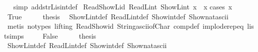 \begin{isabellebody}
%
\isadelimproof
\ \ %
\endisadelimproof
%
\isatagproof
{}\isamarkupfalse%
{\isacharparenleft}{\kern0pt}simp\ add{\isacharcolon}{\kern0pt}strL{\isacharunderscore}{\kern0pt}is{\isacharunderscore}{\kern0pt}int{\isacharprime}{\kern0pt}{\isacharunderscore}{\kern0pt}def{\isacharparenright}{\kern0pt}%
\endisatagproof
{\isafoldproof}%
%
\isadelimproof
\isanewline
%
\endisadelimproof
\isanewline
{}\isamarkupfalse%
\ Read{\isacharunderscore}{\kern0pt}ShowL{\isacharunderscore}{\kern0pt}id{\isacharcolon}{\kern0pt}\ {\isacartoucheopen}ReadL\isactrlsub i\isactrlsub n\isactrlsub t\ {\isacharparenleft}{\kern0pt}ShowL\isactrlsub i\isactrlsub n\isactrlsub t\ x{\isacharparenright}{\kern0pt}\ {\isacharequal}{\kern0pt}\ x{\isacartoucheclose}\isanewline
%
\isadelimproof
%
\endisadelimproof
%
\isatagproof
{}\isamarkupfalse%
{\isacharparenleft}{\kern0pt}cases\ {\isacartoucheopen}x\ {\isacharless}{\kern0pt}\ {}{\isacartoucheclose}{\isacharparenright}{\kern0pt}\isanewline
\ \ \isamarkupfalse%
\ True\isanewline
\ \ \isamarkupfalse%
\ \isamarkupfalse%
\ {\isacharquery}{\kern0pt}thesis\ \isamarkupfalse%
\ ShowL\isactrlsub i\isactrlsub n\isactrlsub t{\isacharunderscore}{\kern0pt}def\ ReadL\isactrlsub i\isactrlsub n\isactrlsub t{\isacharunderscore}{\kern0pt}def\ Show\isactrlsub i\isactrlsub n\isactrlsub t{\isacharunderscore}{\kern0pt}def\ Show\isactrlsub n\isactrlsub a\isactrlsub t{\isacharunderscore}{\kern0pt}ascii\ \isanewline
\ \ \ \ \isamarkupfalse%
\ {\isacharparenleft}{\kern0pt}metis\ {\isacharparenleft}{\kern0pt}no{\isacharunderscore}{\kern0pt}types{\isacharcomma}{\kern0pt}\ lifting{\isacharparenright}{\kern0pt}\ Read{\isacharunderscore}{\kern0pt}Show{\isacharunderscore}{\kern0pt}id\ String{\isachardot}{\kern0pt}ascii{\isacharunderscore}{\kern0pt}of{\isacharunderscore}{\kern0pt}Char\ comp{\isacharunderscore}{\kern0pt}def\ implode{\isachardot}{\kern0pt}rep{\isacharunderscore}{\kern0pt}eq\ list{\isachardot}{\kern0pt}simps{\isacharparenleft}{\kern0pt}{}{\isacharparenright}{\kern0pt}{\isacharparenright}{\kern0pt}\ \isanewline
{}\isamarkupfalse%
\isanewline
\ \ \isamarkupfalse%
\ False\isanewline
\ \ \isamarkupfalse%
\ \isamarkupfalse%
\ {\isacharquery}{\kern0pt}thesis\ \isamarkupfalse%
\ ShowL\isactrlsub i\isactrlsub n\isactrlsub t{\isacharunderscore}{\kern0pt}def\ ReadL\isactrlsub i\isactrlsub n\isactrlsub t{\isacharunderscore}{\kern0pt}def\ Show\isactrlsub i\isactrlsub n\isactrlsub t{\isacharunderscore}{\kern0pt}def\ Show\isactrlsub n\isactrlsub a\isactrlsub t{\isacharunderscore}{\kern0pt}ascii\ \isanewline

\end{isabellebody}
